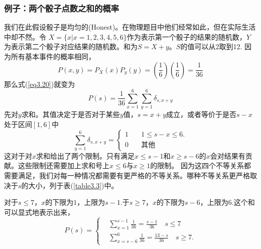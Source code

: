 \documentclass[UTF8]{ctexart}
\numberwithin{equation}{section}%
\numberwithin{figure}{section}%
\begin{document}
    \subsubsection*{例子：两个骰子点数之和的概率}
    我们在此假设骰子是均匀的(Honest)。在物理题目中他们经常如此，但在实际生活中却不然。令
    $X=\{x|x=1,2,3,4,5,6\}$作为表示第一个骰子的结果的随机数，$Y$为表示第二个骰子对应结果的随机数。和为$S=X+y$。$S$的值可以从2取到12.
    因为所有基本事件的概率相同，
    \begin{equation}
        P(x,y)=P_X(x)P_y(y)=(\frac{1}{6})(\frac{1}{6})=\frac{1}{36}
    \end{equation}
    那么式(\ref{eq3.20})就变为
    \begin{equation}\label{eq3.22}
        P(s)=\frac{1}{36}\sum^6_{x=1}\sum^6_{y=1}\delta_{s,x+y}
    \end{equation}
    先对$y$求和。其值决定于是否对于某些$y$值，$s=x+y$成立，或者等价于是否$s-x$处于区间$[1,6]$中
    \begin{equation}
        \sum^6_{y=1}\delta_{s,x+y}=\left\{
        \begin{aligned}
        1\quad &1\leq s-x\leq 6.\\
        0\quad & \mbox{其他}
        \end{aligned}
        \right.
    \end{equation}
    这对于对$x$求和给出了两个限制。只有满足$x\leq s-1$和$x\geq s-6$的$x$会对结果有贡献。这些限制还需要加上求和号上$x\leq 6$与$x \geq 1$的限制。
    因为这四个不等关系都需要满足，我们对每一种情况都需要有更严格的不等关系。哪种不等关系更严格取决于$s$的大小，列于表(\ref{table3.3})中。
    
    对于$s\leq 7$，$x$的下限为$1$，上限为$s-1$.于$s\geq 7$，$x$的下限为$s-6$，上限为$6$.这个和可以显式地表示出来，
    \begin{equation}
        P(s)=\left\{
            \begin{aligned}
            &\sum^{s-1}_{x=1}\frac{1}{36}=\frac{s-1}{36}\quad s\leq 7 \\
            &\sum^{6}_{x=s-6}\frac{1}{36}=\frac{13-s}{36}\quad s\geq 7.
            \end{aligned}
            \right.
    \end{equation}
    
\end{document}
